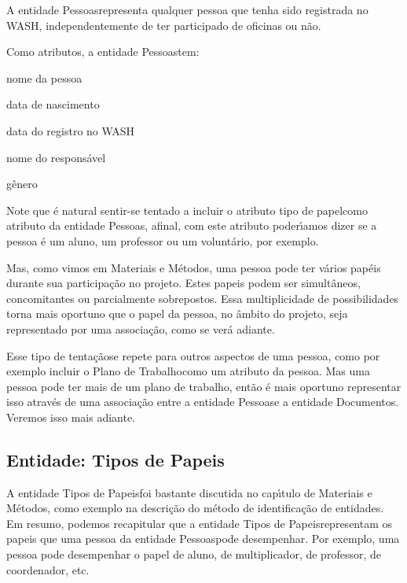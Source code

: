 \documentclass[
12pt,		%
openright,	%
twoside,  %
a4paper,			%
chapter=TITLE,		%
english,			%
french,				%
spanish,			%
brazil				%
]{USPSC-classe/USPSC}
\begin{document}
A entidade \textquotedbl Pessoas\textquotedbl  representa qualquer pessoa que tenha sido registrada no WASH, independentemente de ter participado de oficinas ou n\~ao.


Como atributos, a entidade \textquotedbl Pessoas\textquotedbl  tem:



\begin{alineas}
\item nome da pessoa
\item data de nascimento
\item data do registro no WASH
\item nome do respons\'avel
\item g\^enero
\end{alineas}

Note que \'e natural sentir-se tentado a incluir o atributo \textquotedbl tipo de papel\textquotedbl  como atributo da entidade \textquotedbl Pessoas\textquotedbl , afinal, com este atributo poder\'{\i}amos dizer se a pessoa \'e um aluno, um professor ou um volunt\'ario, por exemplo.


Mas, como vimos em Materiais e M\'etodos, uma pessoa pode ter v\'arios pap\'eis durante sua participa\c{c}\~ao no projeto. Estes papeis podem ser simult\^aneos, concomitantes ou parcialmente sobrepostos. Essa multiplicidade de possibilidades torna mais oportuno que  o papel da pessoa, no \^ambito do projeto, seja representado por uma associa\c{c}\~ao, como se ver\'a adiante.


Esse tipo de \textquotedbl tenta\c{c}\~ao\textquotedbl  se repete para outros aspectos de uma pessoa, como por exemplo incluir o \textquotedbl Plano de Trabalho\textquotedbl  como um atributo da pessoa. Mas uma pessoa pode ter mais de um plano de trabalho, ent\~ao \'e mais oportuno representar isso atrav\'es de uma associa\c{c}\~ao entre a entidade \textquotedbl Pessoas\textquotedbl  e a entidade \textquotedbl Documentos\textquotedbl . Veremos isso mais adiante.


\subsection[Entidade: Tipos de Papeis]{Entidade: Tipos de Papeis}\label{Entidade: Tipos de Papeis}
A entidade \textquotedbl Tipos de Papeis\textquotedbl  foi bastante discutida no cap\'{\i}tulo de Materiais e M\'etodos, como exemplo na descri\c{c}\~ao do m\'etodo de identifica\c{c}\~ao de entidades. Em resumo, podemos recapitular que a entidade \textquotedbl Tipos de Papeis\textquotedbl  representam os papeis que uma pessoa da entidade \textquotedbl Pessoas\textquotedbl  pode desempenhar. Por exemplo, uma pessoa pode desempenhar o papel de aluno, de multiplicador, de professor, de coordenador, etc.
\end{document}

